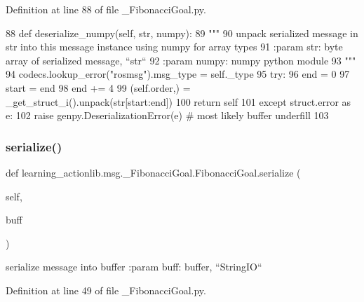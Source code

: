 Definition at line 88 of file \+\_\+\+Fibonacci\+Goal.\+py.


\begin{DoxyCode}
88   \textcolor{keyword}{def }deserialize\_numpy(self, str, numpy):
89     \textcolor{stringliteral}{"""}
90 \textcolor{stringliteral}{    unpack serialized message in str into this message instance using numpy for array types}
91 \textcolor{stringliteral}{    :param str: byte array of serialized message, ``str``}
92 \textcolor{stringliteral}{    :param numpy: numpy python module}
93 \textcolor{stringliteral}{    """}
94     codecs.lookup\_error(\textcolor{stringliteral}{"rosmsg"}).msg\_type = self.\_type
95     \textcolor{keywordflow}{try}:
96       end = 0
97       start = end
98       end += 4
99       (self.order,) = \_get\_struct\_i().unpack(str[start:end])
100       \textcolor{keywordflow}{return} self
101     \textcolor{keywordflow}{except} struct.error \textcolor{keyword}{as} e:
102       \textcolor{keywordflow}{raise} genpy.DeserializationError(e)  \textcolor{comment}{# most likely buffer underfill}
103 
\end{DoxyCode}
\mbox{\label{classlearning__actionlib_1_1msg_1_1__FibonacciGoal_1_1FibonacciGoal_aecd7a893cadcc8fba43dcfd77664df0f}} 
\subsubsection{\texorpdfstring{serialize()}{serialize()}}
{\footnotesize\ttfamily def learning\+\_\+actionlib.\+msg.\+\_\+\+Fibonacci\+Goal.\+Fibonacci\+Goal.\+serialize (\begin{DoxyParamCaption}\item[{}]{self,  }\item[{}]{buff }\end{DoxyParamCaption})}

\begin{DoxyVerb}serialize message into buffer
:param buff: buffer, ``StringIO``
\end{DoxyVerb}
 

Definition at line 49 of file \+\_\+\+Fibonacci\+Goal.\+py.


